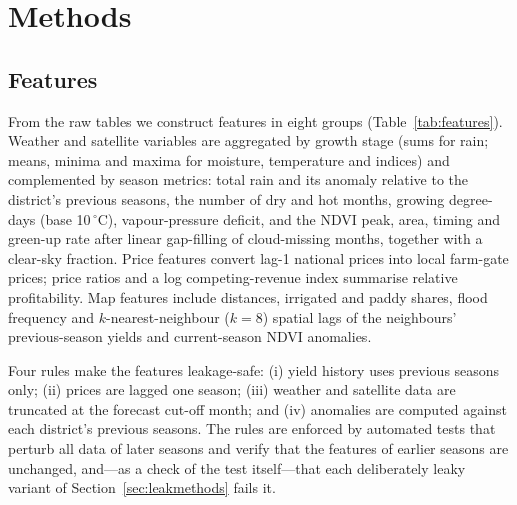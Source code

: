 \section{Methods}\label{sec:methods}

\subsection{Features}
From the raw tables we construct \nFeatures{} features in eight groups (Table~\ref{tab:features}). Weather and satellite variables are aggregated by growth stage (sums for rain; means, minima and maxima for moisture, temperature and indices) and complemented by season metrics: total rain and its anomaly relative to the district's previous seasons, the number of dry and hot months, growing degree-days (base 10\,$^\circ$C), vapour-pressure deficit, and the NDVI peak, area, timing and green-up rate after linear gap-filling of cloud-missing months, together with a clear-sky fraction. Price features convert lag-1 national prices into local farm-gate prices; price ratios and a log competing-revenue index summarise relative profitability. Map features include distances, irrigated and paddy shares, flood frequency and $k$-nearest-neighbour ($k=8$) spatial lags of the neighbours' previous-season yields and current-season NDVI anomalies.

Four rules make the features leakage-safe: (i) yield history uses previous seasons only; (ii) prices are lagged one season; (iii) weather and satellite data are truncated at the forecast cut-off month; and (iv) anomalies are computed against each district's previous seasons. The rules are enforced by automated tests that perturb all data of later seasons and verify that the features of earlier seasons are unchanged, and---as a check of the test itself---that each deliberately leaky variant of Section~\ref{sec:leakmethods} fails it.



